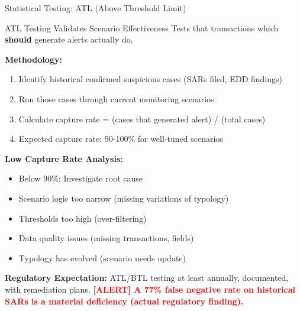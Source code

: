 \documentclass[11pt,a4paper]{beamer}
\newcommand{\redflag}[1]{\textcolor{red}{\textbf{[ALERT] #1}}}
\begin{document}
\begin{frame}{Statistical Testing: ATL (Above Threshold Limit)}
	\begin{block}{ATL Testing Validates Scenario Effectiveness}
		Tests that transactions which \textbf{should} generate alerts actually do.
	\end{block}
	\textbf{Methodology:}
	\begin{enumerate}
		\item Identify historical confirmed suspicious cases (SARs filed, EDD findings)
		\item Run those cases through current monitoring scenarios
		\item Calculate capture rate = (cases that generated alert) / (total cases)
		\item Expected capture rate: 90-100\% for well-tuned scenarios
	\end{enumerate}
	\textbf{Low Capture Rate Analysis:}
	\begin{itemize}
		\item Below 90\%: Investigate root cause
		\item Scenario logic too narrow (missing variations of typology)
		\item Thresholds too high (over-filtering)
		\item Data quality issues (missing transactions, fields)
		\item Typology has evolved (scenario needs update)
	\end{itemize}
	\textbf{Regulatory Expectation:} ATL/BTL testing at least annually, documented, with remediation plans.
	\redflag{A 77\% false negative rate on historical SARs is a material deficiency (actual regulatory finding).}
\end{frame}
\end{document}
